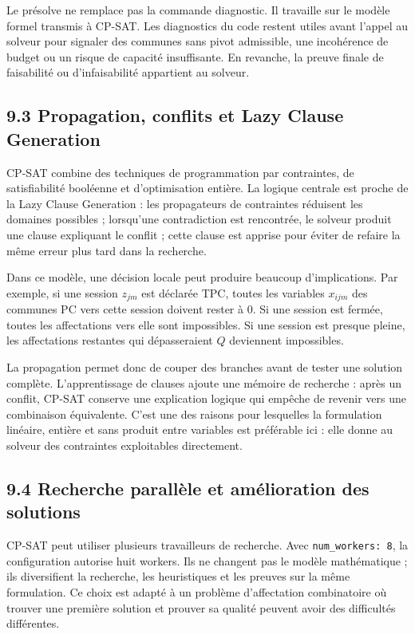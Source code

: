 \documentclass[11pt,a4paper]{article}
\begin{document}
Le présolve ne remplace pas la commande diagnostic. Il travaille sur le modèle formel transmis à CP-SAT. Les diagnostics du code restent utiles avant l'appel au solveur pour signaler des communes sans pivot admissible, une incohérence de budget ou un risque de capacité insuffisante. En revanche, la preuve finale de faisabilité ou d'infaisabilité appartient au solveur.

\subsection{9.3 Propagation, conflits et Lazy Clause Generation}

CP-SAT combine des techniques de programmation par contraintes, de satisfiabilité booléenne et d'optimisation entière. La logique centrale est proche de la Lazy Clause Generation : les propagateurs de contraintes réduisent les domaines possibles ; lorsqu'une contradiction est rencontrée, le solveur produit une clause expliquant le conflit ; cette clause est apprise pour éviter de refaire la même erreur plus tard dans la recherche.

Dans ce modèle, une décision locale peut produire beaucoup d'implications. Par exemple, si une session $z_{jm}$ est déclarée TPC, toutes les variables $x_{ijm}$ des communes PC vers cette session doivent rester à $0$. Si une session est fermée, toutes les affectations vers elle sont impossibles. Si une session est presque pleine, les affectations restantes qui dépasseraient $Q$ deviennent impossibles.

La propagation permet donc de couper des branches avant de tester une solution complète. L'apprentissage de clauses ajoute une mémoire de recherche : après un conflit, CP-SAT conserve une explication logique qui empêche de revenir vers une combinaison équivalente. C'est une des raisons pour lesquelles la formulation linéaire, entière et sans produit entre variables est préférable ici : elle donne au solveur des contraintes exploitables directement.

\subsection{9.4 Recherche parallèle et amélioration des solutions}

CP-SAT peut utiliser plusieurs travailleurs de recherche. Avec \texttt{num\_workers: 8}, la configuration autorise huit workers. Ils ne changent pas le modèle mathématique ; ils diversifient la recherche, les heuristiques et les preuves sur la même formulation. Ce choix est adapté à un problème d'affectation combinatoire où trouver une première solution et prouver sa qualité peuvent avoir des difficultés différentes.
\end{document}

